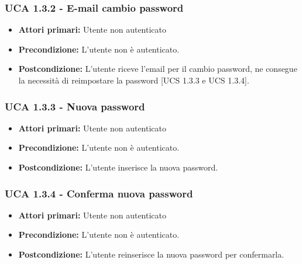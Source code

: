 \subsubsection{UCA 1.3.2 - E-mail cambio password}
\begin{itemize}
\item \textbf{Attori primari:} Utente non autenticato
\item \textbf{Precondizione:} L'utente non è autenticato.
\item \textbf{Postcondizione:} L'utente riceve l'email per il cambio password, ne consegue la necessità di reimpostare la password [UCS 1.3.3 e UCS 1.3.4].
\end{itemize}

\subsubsection{UCA 1.3.3 - Nuova password}
\begin{itemize}
\item \textbf{Attori primari:} Utente non autenticato
\item \textbf{Precondizione:}  L'utente non è autenticato.
\item \textbf{Postcondizione:} L'utente inserisce la nuova password.
\end{itemize}

\subsubsection{UCA 1.3.4 - Conferma nuova password}
\begin{itemize}
\item \textbf{Attori primari:} Utente non autenticato
\item \textbf{Precondizione:} L'utente non è autenticato.
\item \textbf{Postcondizione:} L'utente reinserisce la nuova password per confermarla.
\end{itemize}

